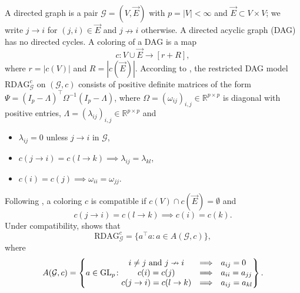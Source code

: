\documentclass[12pt]{amsart}
\theoremstyle{plain}
\theoremstyle{definition}
\theoremstyle{remark}
\newcommand{\R}{\mathbb{R}}
\newcommand{\1}{\mathbf{1}}
\begin{document}
A directed graph is a pair $\mathcal{G}=(V,\vec{E})$ with $p=|V|<\infty$ and $\vec{E}\subset V\times V$; we write $j\to i$ for $(j,i)\in\vec{E}$ and $j\nrightarrow i$ otherwise. A directed acyclic graph (DAG) has no directed cycles. A coloring of a DAG is a map
\[
c\colon V\cup\vec{E}\to [r+R],
\]
where $r=|c(V)|$ and $R=|c(\vec E)|$. 
According to \citet[Definition~2.1]{Seigal23}, the restricted DAG model $\mathrm{RDAG}_{\mathcal{G}}^c$ on $(\mathcal{G},c)$ consists of positive definite matrices of the form $\Psi=(I_p-\Lambda)^\top\Omega^{-1}(I_p-\Lambda)$, where $\Omega=(\omega_{ij})_{i,j}\in\R^{p\times p}$ is diagonal with positive entries, $\Lambda=(\lambda_{ij})_{i,j}\in\R^{p\times p}$ and
\begin{itemize}
    \item $\lambda_{ij}=0$ unless $j\to i$ in $\mathcal{G}$,
    \item $c(j\to i)=c(l\to k)\implies \lambda_{ij}=\lambda_{kl}$,
    \item $c(i)=c(j)\implies \omega_{ii}=\omega_{jj}$.
\end{itemize}
Following \citet[Definition~2.5]{Seigal23}, a coloring $c$ is compatible if \mbox{$c(V)\cap c(\vec{E})=\emptyset$} and
\[
c(j\to i)=c(l\to k)\implies c(i)=c(k).
\]
Under compatibility, \citet[Proposition~2.7]{Seigal23} shows that
\[
\mathrm{RDAG}_{\mathcal{G}}^c = \{a^\top a \colon a\in A(\mathcal{G},c)\},
\]
where
\[
A(\mathcal{G},c)
= \left\{ a\in\mathrm{GL}_p \colon
\begin{array}{@{}ccl@{}}
i\neq j \ \text{and}\ j\nrightarrow i &\Longrightarrow& a_{ij}=0\\
c(i)=c(j) &\Longrightarrow& a_{ii}=a_{jj}\\
c(j\to i)=c(l\to k) &\Longrightarrow& a_{ij}=a_{kl}
\end{array}
\right\}.
\]
\end{document}

